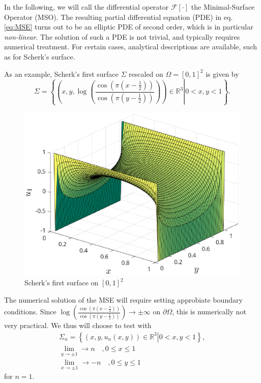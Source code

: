 \documentclass[11pt]{scrartcl}
\newcommand{\mSurf}[1]{\ensuremath{\mathcal{F}\left[#1\right]}}
\begin{document}
In the following, we will call the differential operator $\mSurf{\cdot}$ the Minimal-Surface Operator (MSO). The resulting partial differential equation (PDE) in eq. \eqref{eq:MSE} turns out to be an elliptic PDE of second order, which is in particular \textit{non-linear}. The solution of such a PDE is not trivial, and typically requires numerical treatment. For certain cases, analytical descriptions are available, such as for Scherk's surface.


As an example, Scherk's first surface $\Sigma$ rescaled on $\Omega = [0,1]^2$ is given by
\begin{equation}
	\Sigma = \left\{ \left. \left(x, y, \log \left( \frac{\cos (\pi(x-\frac{1}{2}))}{\cos (\pi(y-\frac{1}{2}))} \right) \right) \in \mathbb{R}^{3} \right  | 0 < x, y < 1 \right\}.
\end{equation} 
\begin{figure}
	\centering
	\includegraphics[width=.8\textwidth]{scherk-test}
	\caption{Scherk's first surface on $[0,1]^2$}
\end{figure}
\newpage
The numerical solution of the MSE will require setting approbiate boundary conditions. Since $\log \left( \frac{\cos (\pi(x-\frac{1}{2}))}{\cos (\pi(y-\frac{1}{2}))} \right) \to \pm \infty $ on $\partial\Omega$, this is numerically not very practical. We thus will choose to test with 
\begin{align}
\Sigma_n = \left\{ \left. \left(x, y, u_n(x,y) \right) \in \mathbb{R}^{3} \right  | 0 < x, y < 1 \right\}, \\
\lim\limits_{y\to \pm 1} \to n \quad, 0 \le x \le 1 \\
\lim\limits_{x\to \pm 1} \to -n \quad, 0 \le y \le 1
\end{align}
for $n=1$. 
\end{document}
